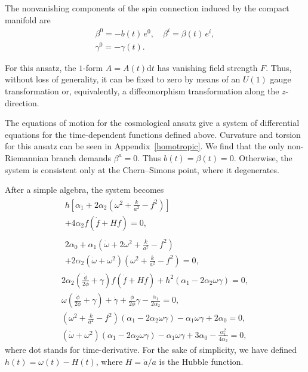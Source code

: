\documentclass[aps,prd,12pt,superscriptaddress,showpacs,showkeys,longbibliography,reprint,nofootinbib]{revtex4-1}
\begin{document}
The nonvanishing components of the spin connection induced by the compact manifold are
\begin{gather}
  \beta^0 = -b(t) \, e^0,\quad \beta^i = \beta(t) \, e^i,\\
  \label{gamma cosmo}
  \gamma^0 =-\gamma(t).
\end{gather}

For this ansatz, the $1$-form $A = A(t)\text{d}t$ has vanishing field strength $F$. Thus, without loss of generality, it can be fixed to zero by means of an $U(1)$ gauge transformation or, equivalently, a diffeomorphism transformation along the $z$-direction.

The equations of motion for the cosmological ansatz give a system of differential equations for the time-dependent functions defined above. Curvature and torsion for this ansatz can be seen in Appendix~\ref{homotropic}. We find that the only non-Riemannian branch demands  $\beta^a=0$. Thus $b(t)=\beta(t)=0$. Otherwise, the system is consistent only at the Chern--Simons point, where it degenerates. 

After a simple algebra, the system becomes
\setlength\multlinegap{0pt}
\begin{gather}
  \label{eqn1}
  \begin{multlined}
    h\left[\alpha_1+2\alpha_2\left(\omega^2+\frac{k}{a^2}-f^2\right)\right] \\
    +4\alpha_2f\left(\dot{f}+Hf\right)=0,
  \end{multlined}
  \\
  \begin{multlined}
    2\alpha_0+\alpha_1\left(\dot{\omega}+2\omega^2+\frac{k}{a^2}-f^2\right)\\
    +2\alpha_2\left(\dot{\omega}+\omega^2\right)\left(\omega^2+\frac{k}{a^2}-f^2\right)=0,
  \end{multlined}
  \\
  2\alpha_2\left(\tfrac{\dot{\phi}}{2\phi}+\gamma\right)f\left(\dot{f}+Hf\right)
  +h^2\left(\alpha_1-2\alpha_2\omega\gamma\right)=0,
  \\
  \omega\left(\frac{\dot{\phi}}{2\phi}+\gamma\right)+\dot{\gamma}+\frac{\dot{\phi}}{2\phi}\gamma-\frac{\alpha_1}{2\alpha_2}=0,
  \\
  \left(\omega^2+\tfrac{k}{a^2}-f^2\right)\left(\alpha_1-2\alpha_2\omega\gamma\right)-\alpha_1\omega\gamma+2\alpha_0=0,
  \\
  \label{eqn2}
  \left(\dot{\omega}+\omega^2\right)\left(\alpha_1-2\alpha_2\omega\gamma\right)-\alpha_1
  \omega\gamma+3\alpha_0 - \frac{\alpha^2_1}{4\alpha_2}=0,
\end{gather}
where dot stands for time-derivative. For the sake of simplicity, we have defined $h(t)=\omega(t)-H(t)$, where $H=\dot{a}/a$ is the Hubble function.
\end{document}
